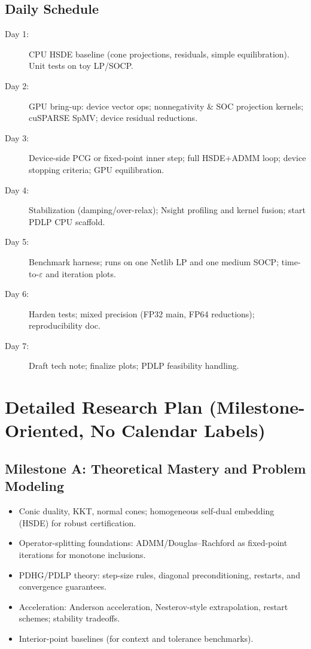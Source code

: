 \documentclass[12pt]{article}
\begin{document}
\subsection*{Daily Schedule}
\begin{description}
  \item[Day 1:] CPU HSDE baseline (cone projections, residuals, simple equilibration). Unit tests on toy LP/SOCP.
  \item[Day 2:] GPU bring-up: device vector ops; nonnegativity \& SOC projection kernels; cuSPARSE SpMV; device residual reductions.
  \item[Day 3:] Device-side PCG or fixed-point inner step; full HSDE+ADMM loop; device stopping criteria; GPU equilibration.
  \item[Day 4:] Stabilization (damping/over-relax); Nsight profiling and kernel fusion; start PDLP CPU scaffold.
  \item[Day 5:] Benchmark harness; runs on one Netlib LP and one medium SOCP; time-to-$\varepsilon$ and iteration plots.
  \item[Day 6:] Harden tests; mixed precision (FP32 main, FP64 reductions); reproducibility doc.
  \item[Day 7:] Draft tech note; finalize plots; PDLP feasibility handling.
\end{description}

\section*{Detailed Research Plan (Milestone-Oriented, No Calendar Labels)}

\subsection*{Milestone A: Theoretical Mastery and Problem Modeling}
\begin{itemize}
  \item Conic duality, KKT, normal cones; homogeneous self-dual embedding (HSDE) for robust certification.
  \item Operator-splitting foundations: ADMM/Douglas--Rachford as fixed-point iterations for monotone inclusions.
  \item PDHG/PDLP theory: step-size rules, diagonal preconditioning, restarts, and convergence guarantees.
  \item Acceleration: Anderson acceleration, Nesterov-style extrapolation, restart schemes; stability tradeoffs.
  \item Interior-point baselines (for context and tolerance benchmarks).
\end{itemize}
\end{document}
